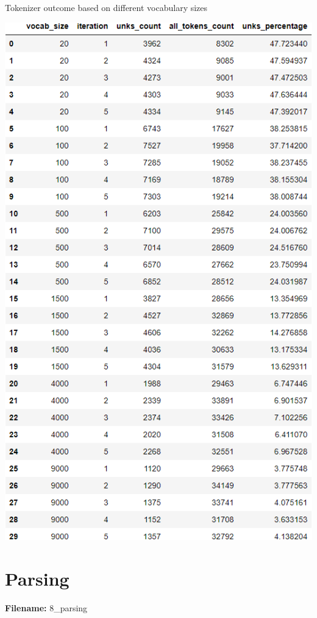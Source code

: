 \documentclass[12pt, a4paper]{article}
\begin{document}
\begin{table}[H]
	\caption{Tokenizer outcome based on different vocabulary sizes} 
	\centering 
	\vspace{5mm} 
	\includegraphics[width=\linewidth, height=\textheight]{../reports/images/token_vocab-size.png}
	\label{token_vocab-size} 
\end{table}



\newpage
\part{Parsing}
\large{\textbf{Filename:} 8\_parsing}
\end{document}
